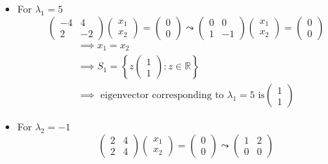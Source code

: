 \begin{itemize}
\item For $\lambda_1 = 5$
\begin{equation}
\begin{pmatrix}
-4 & 4\\
2 & -2
\end{pmatrix}
\begin{pmatrix}
x_1 \\ x_2
\end{pmatrix}=
\begin{pmatrix}
0\\0
\end{pmatrix}
\leadsto 
\begin{pmatrix}
0 & 0\\
1 & -1
\end{pmatrix}
\begin{pmatrix}
x_1 \\ x_2
\end{pmatrix}=
\begin{pmatrix}
0\\0
\end{pmatrix}
\end{equation}
\begin{gather}
\implies x_1 = x_2\\
\implies S_1 = \left\{z\begin{pmatrix}1\\1\end{pmatrix}\colon z \in
  \mathbb{R}\right\}\\
\implies \text{ eigenvector corresponding to } \lambda_1 =5 \text{ is
} \begin{pmatrix}1\\1\end{pmatrix}
\end{gather}
\item For $\lambda_2 = -1$
\begin{equation}
\begin{pmatrix}
2 & 4\\
2 & 4
\end{pmatrix}
\begin{pmatrix}
x_1 \\ x_2
\end{pmatrix}
=
\begin{pmatrix}
0 \\ 0
\end{pmatrix}
\leadsto
\begin{pmatrix}
1 & 2\\
0 & 0
\end{pmatrix}

\end{equation}
\end{itemize}
